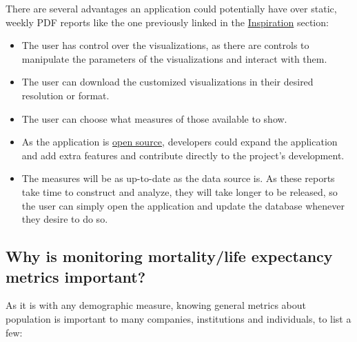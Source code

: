 \documentclass[
  a4paper]{article}
\begin{document}
There are several advantages an application could potentially have over
static, weekly PDF reports like the one previously linked in the
\protect\hyperlink{inspiration}{Inspiration} section:

\begin{itemize}
\item
  The user has control over the visualizations, as there are controls to
  manipulate the parameters of the visualizations and interact with
  them.
\item
  The user can download the customized visualizations in their desired
  resolution or format.
\item
  The user can choose what measures of those available to show.
\item
  As the application is \href{https://github.com/dreth/tfm_uc3m}{open
  source}, developers could expand the application and add extra
  features and contribute directly to the project's development.
\item
  The measures will be as up-to-date as the data source is. As these
  reports take time to construct and analyze, they will take longer to
  be released, so the user can simply open the application and update
  the database whenever they desire to do so.
\end{itemize}

\hypertarget{why-is-monitoring-mortalitylife-expectancy-metrics-important}{%
\subsection{Why is monitoring mortality/life expectancy metrics
important?}\label{why-is-monitoring-mortalitylife-expectancy-metrics-important}}

As it is with any demographic measure, knowing general metrics about
population is important to many companies, institutions and individuals,
to list a few:
\end{document}
